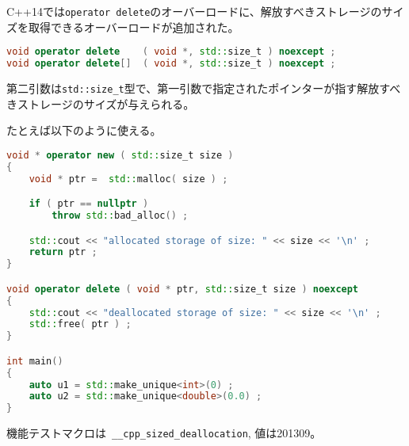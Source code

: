 %

C++14では\lstinline!operator delete!のオーバーロードに、解放すべきストレージのサイズを取得できるオーバーロードが追加された。

\begin{lstlisting}[language=C++]
void operator delete    ( void *, std::size_t ) noexcept ;
void operator delete[]  ( void *, std::size_t ) noexcept ;
\end{lstlisting}

第二引数は\lstinline!std::size_t!型で、第一引数で指定されたポインターが指す解放すべきストレージのサイズが与えられる。

たとえば以下のように使える。

\begin{lstlisting}[language=C++]
void * operator new ( std::size_t size )
{
    void * ptr =  std::malloc( size ) ;

    if ( ptr == nullptr )
        throw std::bad_alloc() ;

    std::cout << "allocated storage of size: " << size << '\n' ;
    return ptr ;
}

void operator delete ( void * ptr, std::size_t size ) noexcept
{
    std::cout << "deallocated storage of size: " << size << '\n' ;
    std::free( ptr ) ;
}

int main()
{
    auto u1 = std::make_unique<int>(0) ;
    auto u2 = std::make_unique<double>(0.0) ;
}
\end{lstlisting}

機能テストマクロは~\lstinline!__cpp_sized_deallocation!, 値は201309。
